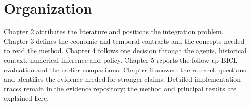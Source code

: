 \section{Organization}\label{s:d7489201492a5b01}
Chapter 2 attributes the literature and positions the integration problem.
Chapter 3 defines the economic and temporal contracts and the concepts
needed to read the method. Chapter 4 follows one decision through the
agents, historical context, numerical inference and policy. Chapter 5
reports the follow-up BICL evaluation and the earlier comparisons.
Chapter 6 answers the research questions and identifies the evidence
needed for stronger claims. Detailed implementation traces remain in the
evidence repository; the method and principal results are explained here.
